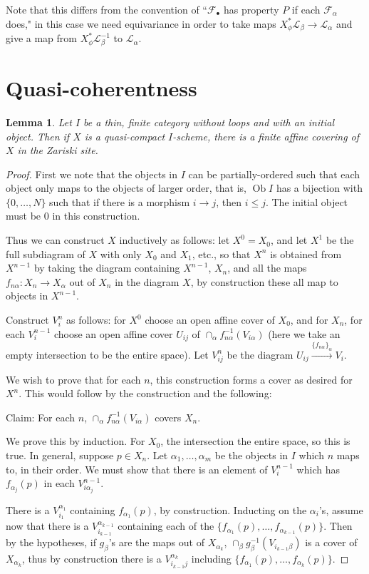 \documentclass{report}
\newtheorem{lemma}[theorem]{Lemma}
\theoremstyle{definition}
\DeclareMathOperator{\Ob}{Ob}
\newcommand{\FF}{\mathscr{F}}
\newcommand{\LL}{\mathcal{L}}
\begin{document}
Note that this differs from the convention of ``$\FF_\bullet$ has property $P$ if each $\FF_\alpha$ does," in this case we need equivariance in order to take maps $X_\phi^* \LL_\beta \rightarrow \LL_\alpha$ and give a map from $X_\phi^* \LL_\beta^{-1}$ to $\LL_\alpha$.

\section{Quasi-coherentness}
	
\begin{lemma}
	\label{lem:affinecover}
	Let $I$ be a thin, finite category without loops and with an initial object.
	Then if $X$ is a quasi-compact $I$-scheme, there is a finite affine covering of $X$ in the Zariski site.
\end{lemma}

\begin{proof}
	First we note that the objects in $I$ can be partially-ordered such that each object only maps to the objects of larger order, that is, $\Ob I$ has a bijection with $\{0, \dots, N\}$ such that if there is a morphism $i \rightarrow j$, then $i \leq j$.
	The initial object must be 0 in this construction.
	
	Thus we can construct $X$ inductively as follows: let $X^0 = X_0$, and let $X^1$ be the full subdiagram of $X$ with only $X_0$ and $X_1$, etc., so that $X^n$ is obtained from $X^{n-1}$ by taking the diagram containing $X^{n-1}$, $X_n$, and all the maps $f_{n\alpha}:X_n \rightarrow X_\alpha$ out of $X_n$ in the diagram $X$, by construction these all map to objects in $X^{n-1}$.
	
	Construct $V_i^n$ as follows: for $X^0$ choose an open affine cover of $X_0$, and for $X_n$, for each $V_i^{n-1}$ choose an open affine cover $U_{ij}$ of $\cap_\alpha f_{n\alpha}^{-1}(V_{i\alpha})$ (here we take an empty intersection to be the entire space).
	Let $V_{ij}^n$ be the diagram $U_{ij} \xrightarrow{\{f_{n\alpha}\}_\alpha} V_i$.
	
	We wish to prove that for each $n$, this construction forms a cover as desired for $X^n$.
	This would follow by the construction and the following:
	
	Claim: For each $n$, $\cap_\alpha f_{n\alpha}^{-1}(V_{i\alpha})$ covers $X_n$.
	
	We prove this by induction.
	For $X_0$, the intersection the entire space, so this is true.
	In general, suppose $p \in X_n$.
	Let $\alpha_1, \dots, \alpha_m$ be the objects in $I$ which $n$ maps to, in their order.
	We must show that there is an element of $V_i^{n-1}$ which has $f_{\alpha_j}(p)$ in each $V_{i \alpha_j}^{n-1}$.
	
	There is a $V_{i_1}^{\alpha_1}$ containing $f_{\alpha_1}(p)$, by construction.
	Inducting on the $\alpha_i$'s, assume now that there is a $V_{i_{k-1}}^{\alpha_{k-1}}$ containing each of the $\{f_{\alpha_1}(p), \dots, f_{\alpha_{k-1}}(p)\}$.
	Then by the hypotheses, if $g_\beta$'s are the maps out of $X_{\alpha_k}$, $\cap_\beta g_{\beta}^{-1}(V_{i_{k-1}\beta})$ is a cover of $X_{\alpha_k}$, thus by construction there is a $V_{i_{k-1}j}^{\alpha_k}$ including $\{f_{\alpha_1}(p), \dots, f_{\alpha_{k}}(p)\}$.
\end{proof}
\end{document}
